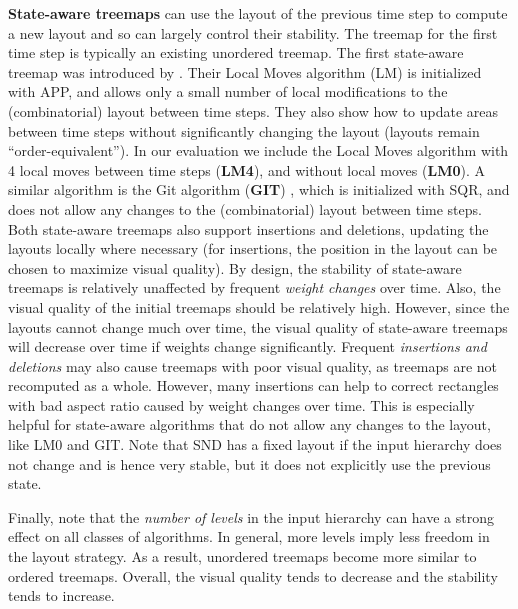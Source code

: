 \smallskip\noindent
\textbf{State-aware treemaps}
can use the layout of the previous time step to compute a new layout and so can largely control their stability. 
The treemap for the first time step is typically an existing unordered treemap. 
The first state-aware treemap was introduced by \cite{sondag17}. Their Local Moves algorithm (LM) is initialized with APP, and allows only a small number of local modifications to the (combinatorial) layout between time steps. They also show how to update areas between time steps without significantly changing the layout (layouts remain ``order-equivalent''). In our evaluation we include the Local Moves algorithm with 4 local moves between time steps (\textbf{LM4}), and without local moves (\textbf{LM0}). A similar algorithm is the Git algorithm (\textbf{GIT}) \cite{vernier18git}, which is initialized with SQR, and does not allow any changes to the (combinatorial) layout between time steps. Both state-aware treemaps also support insertions and deletions, updating the layouts locally where necessary (for insertions, the position in the layout can be chosen to maximize visual quality).
%
By design, the stability of state-aware treemaps is relatively unaffected by frequent \emph{weight changes} over time. Also, the visual quality of the initial treemaps should be relatively high. However, since the layouts cannot change much over time, the visual quality of state-aware treemaps will decrease over time if weights change significantly. Frequent \emph{insertions and deletions} may also cause treemaps with poor visual quality, as treemaps are not recomputed as a whole. However, many insertions can help to correct rectangles with bad aspect ratio caused by weight changes over time. This is especially helpful for state-aware algorithms that do not allow any changes to the layout, like LM0 and GIT. Note that SND has a fixed layout if the input hierarchy does not change and is hence very stable, but it does not explicitly use the previous state.

Finally, note that the \emph{number of levels} in the input hierarchy can have a strong effect on all classes of algorithms. In general, more levels imply less freedom in the layout strategy. As a result, unordered treemaps become more similar to ordered treemaps. Overall, the visual quality tends to decrease and the stability tends to increase. 

